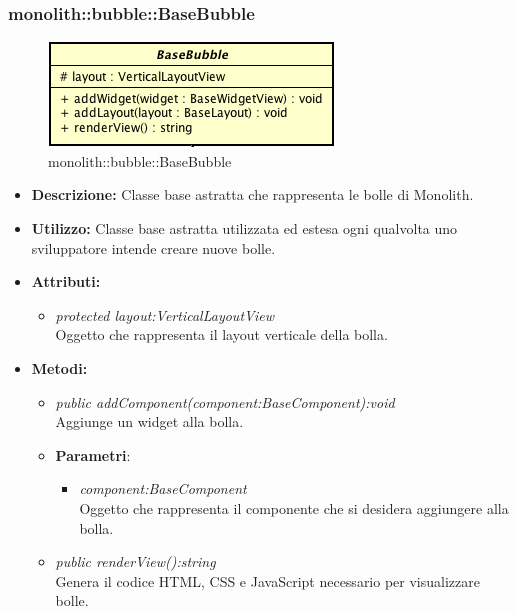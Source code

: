 \subsubsection{monolith::bubble::BaseBubble}

\label{monolith::bubble::BaseBubble}
\begin{figure}[ht]
	\centering
	\includegraphics[scale=0.5]{Sezioni/SottosezioniST/img/BaseBubble.png}
	\caption{monolith::bubble::BaseBubble}
\end{figure}

\begin{itemize}
\item \textbf{Descrizione:} Classe base astratta che rappresenta le bolle di Monolith.
\item \textbf{Utilizzo:} Classe base astratta utilizzata ed estesa ogni qualvolta uno sviluppatore intende creare nuove bolle.
\item \textbf{Attributi:} 
\begin{itemize}
\item \textit{protected layout:VerticalLayoutView}\\
Oggetto che rappresenta il layout verticale della bolla.
\end{itemize}
\item \textbf{Metodi:}
\begin{itemize}
\item \textit{public addComponent(component:BaseComponent):void}\\
Aggiunge un widget alla bolla.
\item{\textbf{Parametri}: \begin{itemize}
\item \textit{component:BaseComponent}\\
Oggetto che rappresenta il componente che si desidera aggiungere alla bolla.
\end{itemize}}
\item \textit{public renderView():string}\\
Genera il codice HTML, CSS e JavaScript necessario per visualizzare bolle.
\end{itemize}
\end{itemize}

